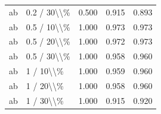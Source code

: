 \begin{table}[!h]
\begin{tabular}[t]{llccc}
\addlinespace
ab & 0.2 / 30\textbackslash{}\textbackslash{}\% & 0.500 & 0.915 & 0.893\\
ab & 0.5 / 10\textbackslash{}\textbackslash{}\% & 1.000 & 0.973 & 0.973\\
ab & 0.5 / 20\textbackslash{}\textbackslash{}\% & 1.000 & 0.972 & 0.973\\
ab & 0.5 / 30\textbackslash{}\textbackslash{}\% & 1.000 & 0.958 & 0.960\\
ab & 1 / 10\textbackslash{}\textbackslash{}\% & 1.000 & 0.959 & 0.960\\
\addlinespace
ab & 1 / 20\textbackslash{}\textbackslash{}\% & 1.000 & 0.958 & 0.960\\
ab & 1 / 30\textbackslash{}\textbackslash{}\% & 1.000 & 0.915 & 0.920\\
\bottomrule
\end{tabular}
\end{table}
